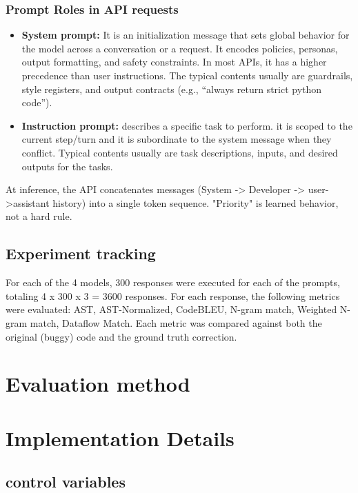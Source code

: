 \subsubsection{Prompt Roles in API requests}
\begin{itemize}
    \item \textbf{System prompt:} It is an initialization message that sets global behavior for the model across a conversation or a request. It encodes policies, personas, output formatting, and safety constraints. In most APIs, it has a higher precedence than user instructions. The typical contents usually are guardrails, style registers, and output contracts (e.g., ``always return strict python code'').
    \item \textbf{Instruction prompt:} describes a specific task to perform. it is scoped to the current step/turn and it is subordinate to the system message when they conflict. Typical contents usually are task descriptions, inputs, and desired outputs for the tasks.
\end{itemize}

At inference, the API concatenates messages (System -> Developer -> user->assistant history) into a single token sequence. "Priority" is learned behavior, not a hard rule.

\subsection{Experiment tracking}
For each of the 4 models, 300 responses were executed for each of the prompts, totaling 4 x 300 x 3 = 3600 responses. For each response, the following metrics were evaluated: AST, AST-Normalized, CodeBLEU, N-gram match, Weighted N-gram match, Dataflow Match.
Each metric was compared against both the original (buggy) code and the ground truth correction.

\section{Evaluation method}




\section{Implementation Details}
\subsection{control variables}
\label{sec:implementation-details}

